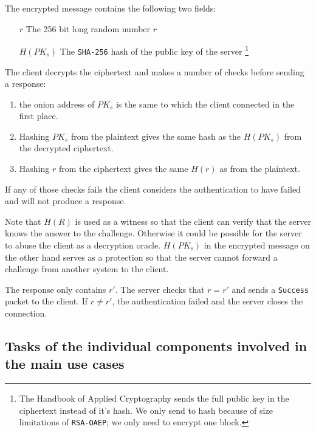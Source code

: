 \documentclass[12pt]{article}
\begin{document}
The encrypted message contains the following two fields:

\begin{enumerate}
\item[$r$] The 256 bit long random number $r$
\item[$H(PK_s)$] The \texttt{SHA-256} hash of the public key of the server \footnote{The Handbook of Applied Cryptography sends the full public key in the ciphertext instead of it's hash. We only send to hash because of size limitations of \texttt{RSA-OAEP}; we only need to encrypt one block.}
\end{enumerate}

The client decrypts the ciphertext and makes a number of checks before sending a response:

\begin{enumerate}
\item the onion address of $PK_s$ is the same to which the client connected in the first place.
\item Hashing $PK_s$ from the plaintext gives the same hash as the $H(PK_s)$ from the decrypted ciphertext.
\item Hashing $r$ from the ciphertext gives the same $H(r)$ as from the plaintext.
\end{enumerate}

If any of those checks fails the client considers the authentication to have failed and will not produce a response.

Note that $H(R)$ is used as a witness so that the client can verify that the server knows the answer to the challenge. Otherwise it could be possible for the server to abuse the client as a decryption oracle.
$H(PK_s)$ in the encrypted message on the other hand serves as a protection so that the server cannot forward a challenge from another system to the client.

The response only contains $r'$. The server checks that $r = r'$ and sends a \texttt{Success} packet to the client. If $r \neq r'$, the authentication failed and the server closes the connection.

\subsection{Tasks of the individual components involved in the main use cases}
\end{document}
